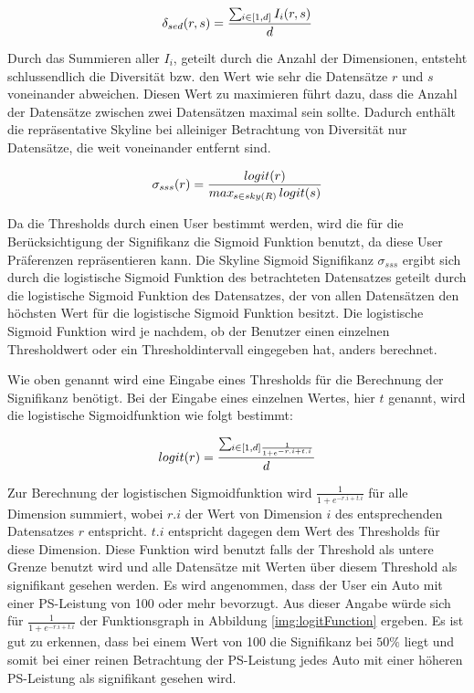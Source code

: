 $$\delta_{sed}(r,s)=\frac{\sum\limits\mathop{}_{\mkern-5mu i \in{[1,d]}} I_i(r,s)}{d}$$

Durch das Summieren aller $I_i$, geteilt durch die Anzahl der Dimensionen, entsteht schlussendlich die Diversität bzw. den Wert wie sehr die Datensätze $r$ und $s$ voneinander abweichen. Diesen Wert zu maximieren führt dazu, dass die Anzahl der Datensätze zwischen zwei Datensätzen maximal sein sollte. Dadurch enthält die repräsentative Skyline bei alleiniger Betrachtung von Diversität nur Datensätze, die weit voneinander entfernt sind. 

$$\sigma_{sss}(r)=\frac{logit(r)}{max\mathop{}_{\mkern-5mu s \in{sky(R)}}logit(s)}$$

Da die Thresholds durch einen User bestimmt werden, wird die für die Berücksichtigung der Signifikanz die Sigmoid Funktion benutzt, da diese User Präferenzen repräsentieren kann. Die Skyline Sigmoid Signifikanz $\sigma_{sss}$ ergibt sich durch die logistische Sigmoid Funktion des betrachteten Datensatzes geteilt durch die logistische Sigmoid Funktion des Datensatzes, der von allen Datensätzen den höchsten Wert für die logistische Sigmoid Funktion besitzt. Die logistische Sigmoid Funktion wird je nachdem, ob der Benutzer einen einzelnen Thresholdwert oder ein Thresholdintervall eingegeben hat, anders berechnet.

Wie oben genannt wird eine Eingabe eines Thresholds für die Berechnung der Signifikanz benötigt. Bei der Eingabe eines einzelnen Wertes, hier $t$ genannt, wird die logistische Sigmoidfunktion wie folgt bestimmt:

$$logit(r)=\frac{\sum\mathop{}_{\mkern-5mu i \in{[1,d]}\frac{1}{1+e^{-r.i+t.i}}}}{d}$$

Zur Berechnung der logistischen Sigmoidfunktion  wird $\frac{1}{1+e^{-r.i+t.i}}$ für alle Dimension summiert, wobei $r.i$ der Wert von Dimension $i$ des entsprechenden Datensatzes $r$ entspricht. $t.i$ entspricht dagegen dem Wert des Thresholds für diese Dimension. Diese Funktion wird benutzt falls der Threshold als untere Grenze benutzt wird und alle Datensätze mit Werten über diesem Threshold als signifikant gesehen werden. 
Es wird angenommen, dass der User ein Auto mit einer PS-Leistung von 100 oder mehr bevorzugt. Aus dieser Angabe würde sich für $\frac{1}{1+e^{-r.i+t.i}}$ der Funktionsgraph in Abbildung \ref{img:logitFunction} ergeben. Es ist gut zu erkennen, dass bei einem Wert von 100 die Signifikanz bei $50\%$ liegt und somit bei einer reinen Betrachtung der PS-Leistung jedes Auto mit einer höheren PS-Leistung als signifikant gesehen wird.

